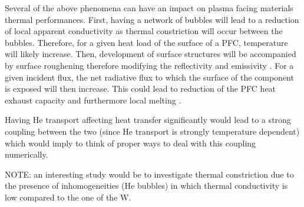 Several of the above phenomena can have an impact on plasma facing materials thermal performances.
First, having a network of bubbles will lead to a reduction of local apparent conductivity as thermal constriction will occur between the bubbles.
Therefore, for a given heat load of the surface of a PFC, temperature will likely increase.
Then, development of surface structures will be accompanied by surface roughening therefore modifying the reflectivity and emissivity \cite{tokunaga_synergistic_2004}.
For a given incident flux, the net radiative flux to which the surface of the component is exposed will then increase.
This could lead to reduction of the PFC heat exhaust capacity and furthermore local melting \cite{wirtz_influence_2016}.

Having He transport affecting heat transfer significantly would lead to a strong coupling between the two (since He transport is strongly temperature dependent) which would imply to think of proper ways to deal with this coupling numerically.

NOTE: an interesting study would be to investigate thermal constriction due to the presence of inhomogeneities (He bubbles) in which thermal conductivity is low compared to the one of the W.
